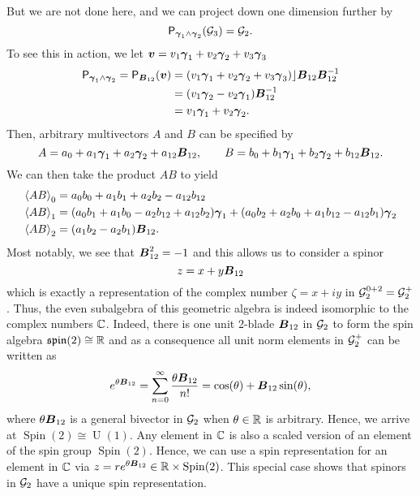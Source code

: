 But we are not done here, and we can project down one dimension further by
\begin{equation}
    \projection_{\blade{\gamma}_1 \wedge \blade{\gamma}_2} (\G_3) = \G_2.
\end{equation}
To see this in action, we let $\blade{v}=v_1 \blade{\gamma}_1 + v_2 \blade{\gamma}_2 + v_3 \blade{\gamma}_3$
\begin{subequations}
\begin{align}
    \projection_{\blade{\gamma}_1 \wedge \blade{\gamma}_2} = \projection_{\blade{B}_{12}} (\blade{v}) &= (v_1 \blade{\gamma}_1 + v_2 \blade{\gamma}_2 + v_3 \blade{\gamma}_3)\rfloor \blade{B}_{12}\blade{B}_{12}^{-1}\\
    &= (v_1 \blade{\gamma}_2 - v_2 \blade{\gamma}_1)\blade{B}_{12}^{-1} \\
    &= v_1 \blade{\gamma}_1 + v_2 \blade{\gamma}_2.
\end{align}
\end{subequations}
Then, arbitrary multivectors $A$ and $B$ can be specified by
\begin{equation}
A = a_0 + a_1 \blade{\gamma}_1 + a_2 \blade{\gamma}_2 + a_{12} \blade{B}_{12}, \qquad B = b_0 +b_1 \blade{\gamma}_1 + b_2 \blade{\gamma}_2 + b_{12}\blade{B}_{12}.
\end{equation}
We can then take the product $AB$ to yield
\begin{subequations}
\begin{align}
\proj{0}{AB} &= a_0b_0 + a_1 b_1 + a_2 b_2 - a_{12}b_{12}\\
\proj{1}{AB} &= (a_0 b_1 + a_1 b_0 - a_2 b_{12} + a_{12} b_2) \blade{\gamma}_1 + (a_0 b_2 + a_2 b_0 + a_1b_{12} - a_{12} b_1) \blade{\gamma}_2\\
\proj{2}{AB} &= (a_1b_2 - a_2 b_1)\blade{B}_{12}.
\end{align}
\end{subequations}
Most notably, we see that $\blade{B}_{12}^2=-1$ and this allows us to consider a spinor
\begin{equation}
z = x + y \blade{B}_{12}
\end{equation}
which is exactly a representation of the complex number $\zeta = x+ iy$ in $\G_2^{0+2}=\G_2^+$.  Thus, the even subalgebra of this geometric algebra is indeed isomorphic to the complex numbers $\C$. Indeed, there is one unit 2-blade $\blade{B}_{12}$ in $\G_2$ to form the spin algebra $\mathfrak{spin}(2) \cong \R$ and as a consequence all unit norm elements in $\G_2^+$ can be written as
\begin{equation}
   e^{\theta \blade{B}_{12}} = \sum_{n=0}^\infty \frac{\theta \blade{B}_{12}}{n!} = \cos(\theta)+\blade{B}_{12}\sin(\theta),
\end{equation}
where $\theta \blade{B}_{12}$ is a general bivector in $\G_2$ when $\theta \in \R$ is arbitrary. Hence, we arrive at $\operatorname{Spin}(2)\cong \operatorname{U}(1)$. Any element in $\C$ is also a scaled version of an element of the spin group $\operatorname{Spin}(2)$. Hence, we can use a spin representation for an element in $\C$ via $z=re^{\theta \blade{B}_{12}} \in \R\times \operatorname{Spin}(2)$.  This special case shows that spinors in $\G_2$ have a unique spin representation.

